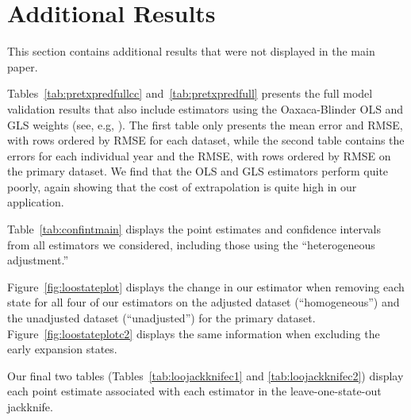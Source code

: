 \section{Additional Results}\label{app:allresults}

This section contains additional results that were not displayed in the main paper.

Tables~\ref{tab:pretxpredfullcc} and~\ref{tab:pretxpredfull} presents the full model validation results that also include estimators using the Oaxaca-Blinder OLS and GLS weights (see, e.g, \citet{kline2011oaxaca}). The first table only presents the mean error and RMSE, with rows ordered by RMSE for each dataset, while the second table contains the errors for each individual year and the RMSE, with rows ordered by RMSE on the primary dataset. We find that the OLS and GLS estimators perform quite poorly, again showing that the cost of extrapolation is quite high in our application. 

Table~\ref{tab:confintmain} displays the point estimates and confidence intervals from all estimators we considered, including those using the ``heterogeneous adjustment.''

Figure~\ref{fig:loostateplot} displays the change in our estimator when removing each state for all four of our estimators on the adjusted dataset (``homogeneous'') and the unadjusted dataset (``unadjusted'') for the primary dataset. Figure~\ref{fig:loostateplotc2} displays the same information when excluding the early expansion states. 

Our final two tables (Tables~\ref{tab:loojackknifec1} and \ref{tab:loojackknifec2}) display each point estimate associated with each estimator in the leave-one-state-out jackknife.

